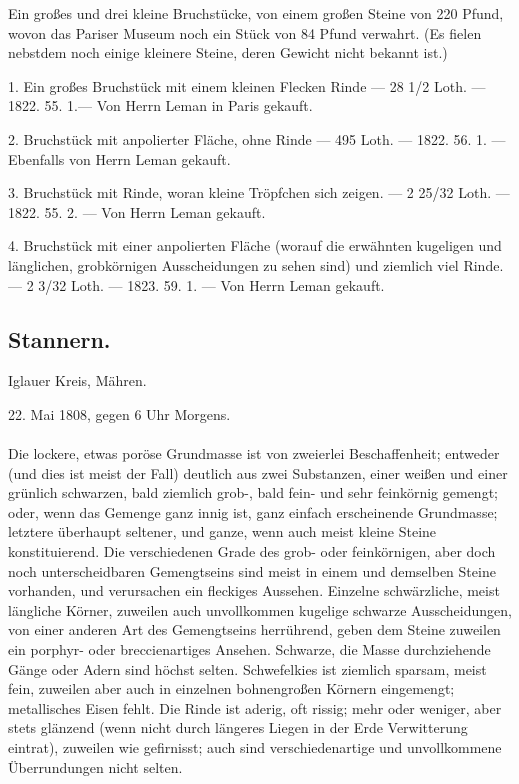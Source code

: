 \documentclass[a4paper, 11pt, oneside, polutonikogreek, german]{article}
\begin{document}
Ein großes und drei kleine Bruchstücke, von einem großen Steine von 220 Pfund, wovon das Pariser Museum noch ein Stück von 84 Pfund verwahrt. (Es fielen nebstdem noch einige kleinere Steine, deren Gewicht nicht bekannt ist.)

1. Ein großes Bruchstück mit einem kleinen Flecken Rinde — 28 1/2 Loth. — 1822. 55. 1.— Von Herrn Leman in Paris gekauft.

2. Bruchstück mit anpolierter Fläche, ohne Rinde — 495 Loth. — 1822. 56. 1. — Ebenfalls von Herrn Leman gekauft.

3. Bruchstück mit Rinde, woran kleine Tröpfchen sich zeigen. — 2 25/32 Loth. — 1822. 55. 2. — Von Herrn Leman gekauft.

4. Bruchstück mit einer anpolierten Fläche (worauf die erwähnten kugeligen und länglichen, grobkörnigen Ausscheidungen zu sehen sind) und ziemlich viel Rinde. — 2 3/32 Loth. — 1823. 59. 1. — Von Herrn Leman gekauft.
\subsection{Stannern.}
\begin{center}
\small
Iglauer Kreis, Mähren.

22. Mai 1808, gegen 6 Uhr Morgens.
\end{center}
\paragraph{}
Die lockere, etwas poröse Grundmasse ist von zweierlei Beschaffenheit; entweder (und dies ist meist der Fall) deutlich aus zwei Substanzen, einer weißen und einer grünlich schwarzen, bald ziemlich grob-, bald fein- und sehr feinkörnig gemengt; oder, wenn das Gemenge ganz innig ist, ganz einfach erscheinende Grundmasse; letztere überhaupt seltener, und ganze, wenn auch meist kleine Steine konstituierend. Die verschiedenen Grade des grob- oder feinkörnigen, aber doch noch unterscheidbaren Gemengtseins sind meist in einem und demselben Steine vorhanden, und verursachen ein fleckiges Aussehen. Einzelne schwärzliche, meist längliche Körner, zuweilen auch unvollkommen kugelige schwarze Ausscheidungen, von einer anderen Art des Gemengtseins herrührend, geben dem Steine zuweilen ein porphyr- oder breccienartiges Ansehen. Schwarze, die Masse durchziehende Gänge oder Adern sind höchst selten. Schwefelkies ist ziemlich sparsam, meist fein, zuweilen aber auch in einzelnen bohnengroßen Körnern eingemengt; metallisches Eisen fehlt. Die Rinde ist aderig, oft rissig; mehr oder weniger, aber stets glänzend (wenn nicht durch längeres Liegen in der Erde Verwitterung eintrat), zuweilen wie gefirnisst; auch sind verschiedenartige und unvollkommene Überrundungen nicht selten.
\end{document}
